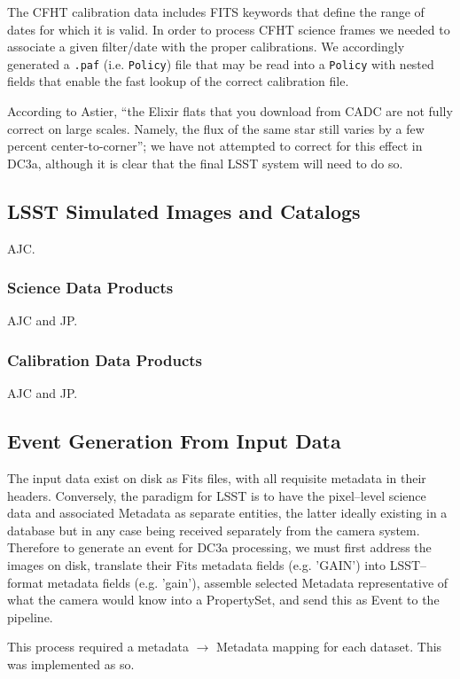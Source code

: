 The CFHT calibration data includes FITS keywords that define the range
of dates for which it is valid.  In order to process CFHT science frames
we needed to associate a given filter/date with the proper calibrations.  We
accordingly generated a \texttt{.paf} (i.e. \texttt{Policy}) file that may
be read into a \texttt{Policy} with nested fields that enable the fast
lookup of the correct calibration file.

According to Astier, ``the Elixir flats that you download from CADC
are not fully correct on large scales. Namely, the flux of the same
star still varies by a few percent center-to-corner'';  we have not
attempted to correct for this effect in DC3a,  although it is clear
that the final LSST system will need to do so.

\subsection{LSST Simulated Images and Catalogs}

AJC.

\subsubsection{Science Data Products}

AJC and JP.

\subsubsection{Calibration Data Products}

AJC and JP.



\subsection{Event Generation From Input Data}

The input data exist on disk as Fits files, with all requisite
metadata in their headers.  Conversely, the paradigm for LSST is to
have the pixel--level science data and associated Metadata as separate
entities, the latter ideally existing in a database but in any case
being received separately from the camera system.  Therefore to
generate an event for DC3a processing, we must first address the
images on disk, translate their Fits metadata fields (e.g. 'GAIN')
into LSST--format metadata fields (e.g. 'gain'), assemble selected Metadata
representative of what the camera would know into a PropertySet, and
send this as Event to the pipeline.

This process required a metadata $\rightarrow$ Metadata mapping for each dataset.
This was implemented as so.
